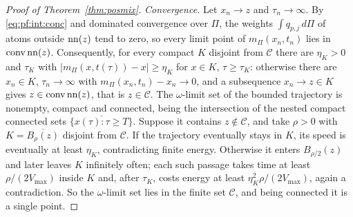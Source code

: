 \documentclass{article}
\theoremstyle{plain}
\theoremstyle{remark}
\begin{document}
\begin{proof}[Proof of Theorem~\ref{thm:posmix}]
\emph{Convergence.} Let $x_n\to z$ and $\tau_n\to\infty$. By \eqref{eq:pf:int:conc} and
dominated convergence over $\Pi$, the weights $\int q_{p,j}\,d\Pi$ of atoms outside $\operatorname{nn}(z)$
tend to zero, so every limit point of $m_\Pi(x_n,t_n)$ lies in $\operatorname{conv}\operatorname{nn}(z)$.
Consequently, for every compact $K$ disjoint from $\mathcal C$ there are $\eta_K>0$ and
$\tau_K$ with $|m_\Pi(x,t(\tau))-x|\ge\eta_K$ for $x\in K$, $\tau\ge\tau_K$: otherwise there are
$x_n\in K$, $\tau_n\to\infty$ with $m_\Pi(x_n,t_n)-x_n\to0$, and a subsequence $x_n\to z\in K$
gives $z\in\operatorname{conv}\operatorname{nn}(z)$, that is $z\in\mathcal C$. The $\omega$-limit set of the
bounded trajectory is nonempty, compact and connected, being the intersection of the nested
compact connected sets $\overline{\{x(\tau):\tau\ge T\}}$. Suppose it contains $z\notin\mathcal C$,
and take $\rho>0$ with $K=\overline{B_\rho(z)}$ disjoint from $\mathcal C$. If the trajectory
eventually stays in $K$, its speed is eventually at least $\eta_K$, contradicting finite energy.
Otherwise it enters $B_{\rho/2}(z)$ and later leaves $K$ infinitely often; each such passage
takes time at least $\rho/(2V_{\max})$ inside $K$ and, after $\tau_K$, costs energy at least
$\eta_K^2\rho/(2V_{\max})$, again a contradiction. So the $\omega$-limit set lies in the finite set
$\mathcal C$, and being connected it is a single point.


\end{proof}
\end{document}
